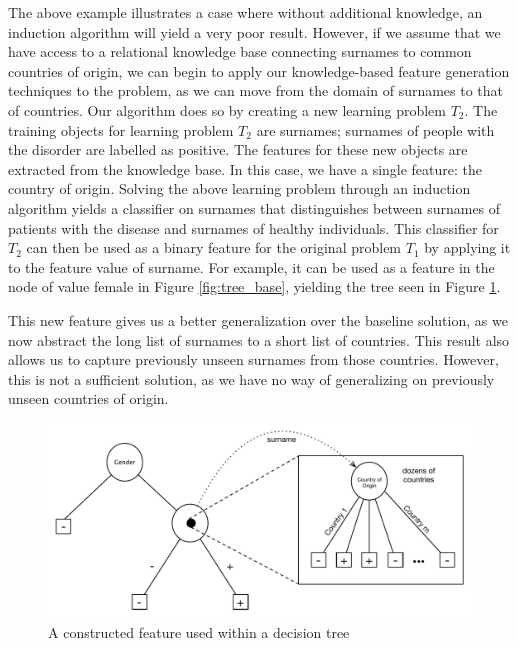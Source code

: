 \documentclass{article}
\theoremstyle{definition}
\begin{document}
The above example illustrates a case where without additional knowledge, an induction algorithm will yield a very poor result. %
However, if we assume that we have access to a relational knowledge base connecting surnames to common countries of origin, we can begin to apply our knowledge-based feature generation techniques to the problem, as we can move from the domain of surnames to that of countries. 
Our algorithm does so by creating a new learning problem $T_2$. The training objects for learning problem $T_2$ are surnames; surnames of people with the disorder are labelled as positive. The features for these new objects are extracted from the knowledge base. In this case, we have a single feature: the country of origin.
Solving the above learning problem through an induction algorithm yields a classifier on surnames that distinguishes between surnames of patients with the disease and surnames of healthy individuals. This classifier for $T_2$ can then be used as a binary feature for the original problem $T_1$ by applying it to the feature value of surname. For example, it can be used as a feature in the node of value female in Figure \ref{fig:tree_base}, yielding the tree seen in Figure \ref{fig:lvl1_tree}. 

This new feature gives us a better generalization over the baseline solution, as we now abstract the long list of surnames to a short list of countries. %
This result also allows us to capture previously unseen surnames from those countries. However, this is not a sufficient solution, as we have no way of generalizing on previously unseen countries of origin. %


\begin{figure}[h]
	\centering
	\includegraphics[width=\linewidth]{fig2.pdf}
	\caption{A constructed feature used within a decision tree}
	\label{fig:lvl1_tree}
\end{figure}
\end{document}
